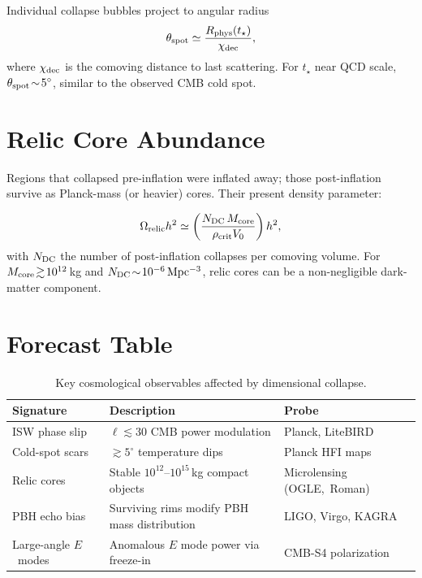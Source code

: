 \documentclass[a4paper, 12pt, oneside]{book}
\numberwithin{equation}{chapter}
\begin{document}
Individual collapse bubbles project to angular radius
\[
    \theta_{\rm spot} \simeq \frac{R_{\rm phys}(t_\star)}{\chi_{\rm dec}},
\]
where $\chi_{\rm dec}$ is the comoving distance to last scattering.
For $t_\star$ near QCD scale, $\theta_{\rm spot}\!\sim\!5^\circ$, similar to
the observed CMB cold spot.

\section{Relic Core Abundance}
\label{sec:RelicDM}

Regions that collapsed pre-inflation were inflated away; those post-inflation
survive as Planck-mass (or heavier) cores.  Their present density parameter:

\[
    \Omega_{\rm relic}h^2 \simeq
    \left(\frac{N_{\rm DC}\,M_{\rm core}}{\rho_{\rm crit} V_0}\right) h^2,
\]
with $N_{\rm DC}$ the number of post-inflation collapses per comoving volume.
For $M_{\rm core}\!\gtrsim\!10^{12}\,$kg and $N_{\rm DC}\!\sim\!10^{-6}\,{\rm
Mpc^{-3}}$, relic cores can be a non-negligible dark-matter component.

\section{Forecast Table}
\label{sec:Forecast}
\begin{table}[ht]
\centering
\renewcommand{\arraystretch}{1.2}
\begin{tabularx}{\textwidth}{@{} >{\raggedright\arraybackslash}l X X @{}} 
\toprule
\textbf{Signature} & \textbf{Description} & \textbf{Probe} \\
\midrule
ISW phase slip & $\ell\!\lesssim\!30$ CMB power \mbox{modulation}           & Planck, LiteBIRD \cite{LiteBIRD2018,CMBS4ScienceBook2016} \\
Cold-spot scars & $\gtrsim\!5^\circ$ temperature dips               & Planck HFI maps    \\
Relic cores     & Stable $10^{12}$–$10^{15}\,$kg compact objects                   & Microlensing (OGLE,~Roman) \\
PBH echo bias   & Surviving rims modify PBH mass distribution        & LIGO, Virgo, KAGRA   \\
Large-angle \mbox{$E$ modes} & Anomalous $E$ mode power via freeze-in       & CMB-S4 polarization \\
\bottomrule
\end{tabularx}
\caption[Key cosmological observables]{Key cosmological observables affected by dimensional collapse.}
\label{tab:cosmo-forecast}
\end{table}
\end{document}
